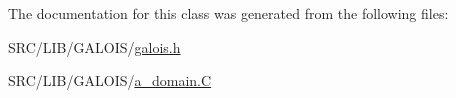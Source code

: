 The documentation for this class was generated from the following files\+:\begin{DoxyCompactItemize}
\item 
S\+R\+C/\+L\+I\+B/\+G\+A\+L\+O\+I\+S/\mbox{\hyperlink{galois_8h}{galois.\+h}}\item 
S\+R\+C/\+L\+I\+B/\+G\+A\+L\+O\+I\+S/\mbox{\hyperlink{a__domain_8_c}{a\+\_\+domain.\+C}}\end{DoxyCompactItemize}
